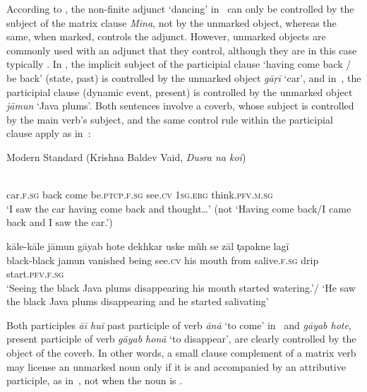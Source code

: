 \documentclass[output=paper]{LSP/langsci}
\begin{document}
According to \citeauthor{Bhatt2007Unaccusativity} \citet{Bhatt2007Unaccusativity}, the non-finite adjunct ‘dancing’ in~ can only be controlled by the subject of the matrix clause \textit{Mina}, not by the unmarked object, whereas the same, when marked, controls the adjunct. However, unmarked objects are commonly used with an adjunct that they control, although they are in this case typically . In , the implicit subject of the participial clause ‘having come back / be back’ (state, past) is controlled by the unmarked object \textit{gāṛī} ‘car’, and in~, the participial clause (dynamic event, present) is controlled by the unmarked object \textit{jāmun} ‘Java plums’. Both sentences involve a coverb, whose subject is controlled by the main verb’s subject, and the same control rule within the participial clause apply as in~:

\ea Modern Standard  (Krishna Baldev Vaid, \emph{Dusra na koi}) %
\label{10-mo-ex:11}

\ea \label{10-mo-ex:11a}
\\
 car.\textsc{f.sg} back come be.\textsc{ptcp.f.sg} see.\textsc{cv} \textsc{1sg.erg} think.\textsc{pfv.m.sg}\\
\glt ‘I saw the car having come back and thought…’ 
 (not `Having come back/I came back and I saw the car.') 

\ex \label{10-mo-ex:11b}
\gll kāle-kāle jāmun gāyab hote dekhkar  uske mũh se zāl t̩apakne lagī\\
 black-black jamun vanished being see.\textsc{cv} his mouth from salive.\textsc{f}\textsc{.sg} drip start.\textsc{pfv.f.sg}\\
\glt ‘Seeing the black Java plums disappearing his mouth started watering.’/ ‘He saw the black Java plums disappearing and he started salivating’ 
\z
\z

Both participles \textit{āī huī} past participle of verb \textit{ānā} ‘to come’ in~ and \textit{gāyab hote}, present participle of verb \textit{gāyab honā} ‘to disappear’, are clearly controlled by the object of the coverb. In other words, a small clause complement of a matrix verb may license an unmarked noun only if it is  and accompanied by an attributive participle, as in~, not when the noun is .
\end{document}
